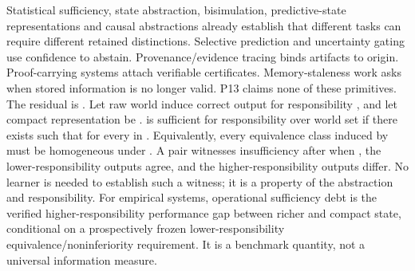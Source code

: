 \markdownRendererDocumentBegin
\markdownRendererSectionBegin
{}\markdownRendererInterblockSeparator
{}Statistical sufficiency, state abstraction, bisimulation, predictive-state representations and causal abstractions already establish that different tasks can require different retained distinctions. Selective prediction and uncertainty gating use confidence to abstain. Provenance/evidence tracing binds artifacts to origin. Proof-carrying systems attach verifiable certificates. Memory-staleness work asks when stored information is no longer valid. P13 claims none of these primitives.\markdownRendererInterblockSeparator
{}The residual is .\markdownRendererInterblockSeparator
{}Let raw world  induce correct output  for responsibility , and let compact representation be .\markdownRendererInterblockSeparator
{}\markdownRendererSectionBegin
{}\markdownRendererInterblockSeparator
{} is sufficient for responsibility  over world set  if there exists  such that  for every  in . Equivalently, every equivalence class induced by  must be homogeneous under .\markdownRendererInterblockSeparator
{}
\markdownRendererSectionEnd \markdownRendererSectionBegin
{}\markdownRendererInterblockSeparator
{}A pair  witnesses insufficiency after  when , the lower-responsibility outputs agree, and the higher-responsibility outputs differ. No learner is needed to establish such a witness; it is a property of the abstraction and responsibility.\markdownRendererInterblockSeparator
{}For empirical systems, operational sufficiency debt is the verified higher-responsibility performance gap between richer and compact state, conditional on a prospectively frozen lower-responsibility equivalence/noninferiority requirement. It is a benchmark quantity, not a universal information measure.
\markdownRendererSectionEnd 
\markdownRendererSectionEnd \markdownRendererDocumentEnd
